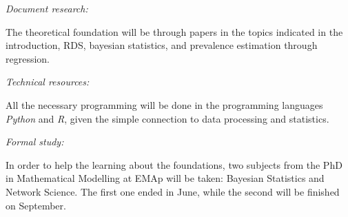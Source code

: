 {\em Document research:}

The theoretical foundation will be through papers in the topics indicated in
the introduction, RDS, bayesian statistics, and prevalence estimation through
regression. 

{\em Technical resources:}

All the necessary programming will be done in the programming languages
\textit{Python} and \textit{R}, given the simple connection to data processing
and
statistics. 

{\em Formal study:}

In order to help the learning about the foundations, two subjects from the
PhD in Mathematical Modelling at EMAp will be taken: Bayesian Statistics and
Network Science. The first one ended in June, while the second will be
finished on September.  